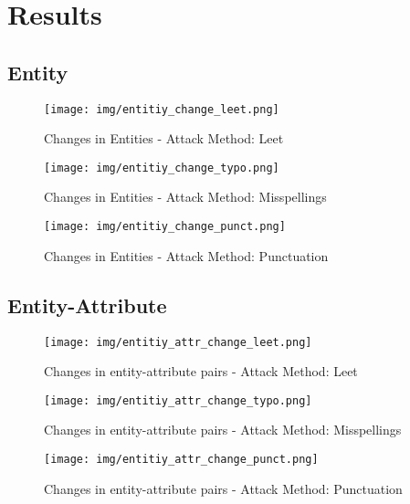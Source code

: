 
\section{Results}
\subsection{Entity}
\begin{figure}
    \centering
    \texttt{[image: img/entitiy\_change\_leet.png]}
    \caption{Changes in Entities - Attack Method: Leet}
    \label{fig:entity_change_leet}
\end{figure}

\begin{figure}
    \centering
    \texttt{[image: img/entitiy\_change\_typo.png]}
    \caption{Changes in Entities - Attack Method: Misspellings}
    \label{fig:entity_change_typo}
\end{figure}

\begin{figure}
    \centering
    \texttt{[image: img/entitiy\_change\_punct.png]}
    \caption{Changes in Entities - Attack Method: Punctuation}
    \label{fig:entity_change_punct}
\end{figure}

\subsection{Entity-Attribute}
\begin{figure}
    \centering
    \texttt{[image: img/entitiy\_attr\_change\_leet.png]}
    \caption{Changes in entity-attribute pairs - Attack Method: Leet}
    \label{fig:entity_attr_change_leet}
\end{figure}

\begin{figure}
    \centering
    \texttt{[image: img/entitiy\_attr\_change\_typo.png]}
    \caption{Changes in entity-attribute pairs - Attack Method: Misspellings}
    \label{fig:entity_attr_change_typo}
\end{figure}

\begin{figure}
    \centering
    \texttt{[image: img/entitiy\_attr\_change\_punct.png]}
    \caption{Changes in entity-attribute pairs - Attack Method: Punctuation}
    \label{fig:entity_attr_change_punct}
\end{figure}


